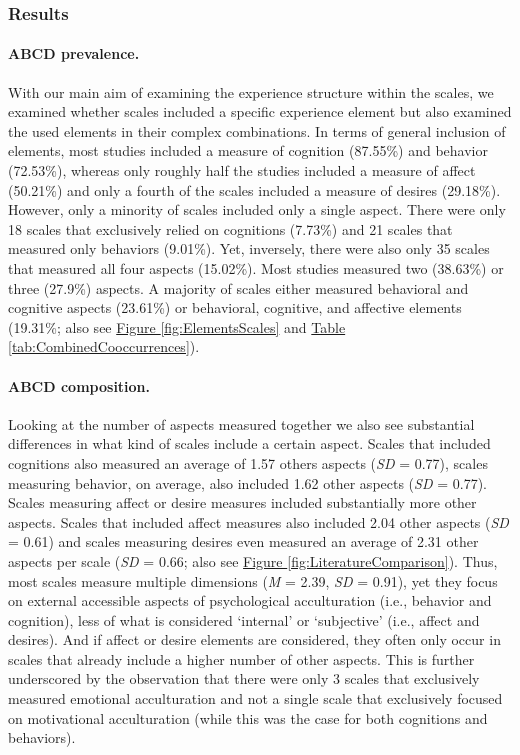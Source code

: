 \documentclass[man, 12pt, a4paper, mask]{apa7}
\newcommand{\fgrref}[2][]{\hyperref[#2]{Figure \ref*{#2}#1}}
\newcommand{\tblref}[2][]{\hyperref[#2]{Table \ref*{#2}#1}}
\begin{document}
\subsubsection{Results}

\paragraph{ABCD prevalence.}

With our main aim of examining the experience structure within the
scales, we examined whether scales included a specific experience
element but also examined the used elements in their complex
combinations. In terms of general inclusion of elements, most studies
included a measure of cognition (87.55\%) and behavior (72.53\%),
whereas only roughly half the studies included a measure of affect
(50.21\%) and only a fourth of the scales included a measure of desires
(29.18\%). However, only a minority of scales included only a single
aspect. There were only 18 scales that exclusively relied on cognitions
(7.73\%) and 21 scales that measured only behaviors (9.01\%). Yet,
inversely, there were also only 35 scales that measured all four aspects
(15.02\%). Most studies measured two (38.63\%) or three (27.9\%)
aspects. A majority of scales either measured behavioral and cognitive
aspects (23.61\%) or behavioral, cognitive, and affective elements
(19.31\%; also see \fgrref{fig:ElementsScales} and
\tblref{tab:CombinedCooccurrences}).

\paragraph{ABCD composition.}

Looking at the number of aspects measured together we also see
substantial differences in what kind of scales include a certain aspect.
Scales that included cognitions also measured an average of 1.57 others
aspects (\textit{SD} = 0.77), scales measuring behavior, on average,
also included 1.62 other aspects (\textit{SD} = 0.77). Scales measuring
affect or desire measures included substantially more other aspects.
Scales that included affect measures also included 2.04 other aspects
(\textit{SD} = 0.61) and scales measuring desires even measured an
average of 2.31 other aspects per scale (\textit{SD} = 0.66; also see
\fgrref{fig:LiteratureComparison}). Thus, most scales measure multiple
dimensions (\textit{M} = 2.39, \textit{SD} = 0.91), yet they focus on
external accessible aspects of psychological acculturation (i.e.,
behavior and cognition), less of what is considered `internal' or
`subjective' (i.e., affect and desires). And if affect or desire
elements are considered, they often only occur in scales that already
include a higher number of other aspects. This is further underscored by
the observation that there were only 3 scales that exclusively measured
emotional acculturation and not a single scale that exclusively focused
on motivational acculturation (while this was the case for both
cognitions and behaviors).
\end{document}
